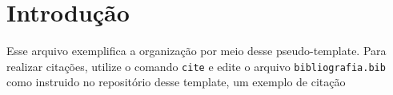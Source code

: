 \section{Introdução}

Esse arquivo exemplifica a organização por meio desse pseudo-template. Para realizar citações, utilize o comando \texttt{cite} e edite o arquivo \texttt{bibliografia.bib} como instruido no repositório desse template, um exemplo de citação \cite{abibliaemingles}
